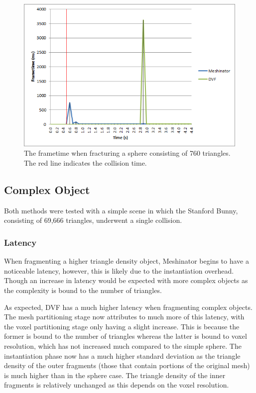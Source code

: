 \begin{figure}[h!]
\centerline{\includegraphics[scale=1.0]{../Logs/single_sphere_frametime.png}}
\caption{The frametime when fracturing a sphere consisting of 760 triangles. The red line indicates the collision time.}
\label{fig:4.16.1}
\end{figure}

\FloatBarrier

\clearpage
\subsection{Complex Object}

Both methods were tested with a simple scene in which the Stanford Bunny, consisting of 69,666 triangles, underwent a single collision.

\FloatBarrier

\subsubsection{Latency}

When fragmenting a higher triangle density object, Meshinator begins to have a noticeable latency, however, this is likely due to the instantiation overhead. Though an increase in latency would be expected with more complex objects as the complexity is bound to the number of triangles.

As expected, DVF has a much higher latency when fragmenting complex objects. The mesh partitioning stage now attributes to much more of this latency, with the voxel partitioning stage only having a slight increase. This is because the former is bound to the number of triangles whereas the latter is bound to voxel resolution, which has not increased much compared to the simple sphere. The instantiation phase now has a much higher standard deviation as the triangle density of the outer fragments (those that contain portions of the original mesh) is much higher than in the sphere case. The triangle density of the inner fragments is relatively unchanged as this depends on the voxel resolution.

